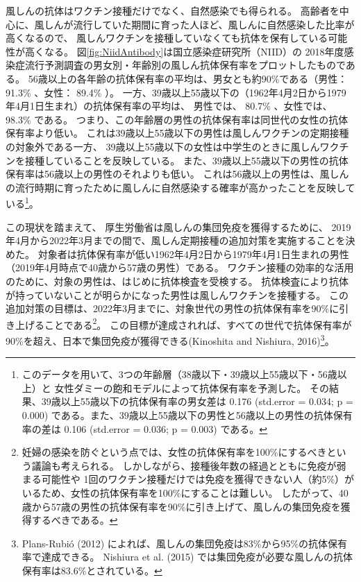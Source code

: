 \documentclass[
  11pt,
  a4paper,
]{article}
\begin{document}
風しんの抗体はワクチン接種だけでなく、自然感染でも得られる。
高齢者を中心に、風しんが流行していた期間に育った人ほど、風しんに自然感染した比率が高くなるので、
風しんワクチンを接種していなくても抗体を保有している可能性が高くなる。
図\ref{fig:NiidAntibody}は国立感染症研究所（NIID）の
2018年度感染症流行予測調査の男女別・年齢別の風しん抗体保有率をプロットしたものである。
56歳以上の各年齢の抗体保有率の平均は、男女とも約90\%である（男性：
91.3\%
、女性：
89.4\%
）。
一方、39歳以上55歳以下の（1962年4月2日から1979年4月1日生まれ）の抗体保有率の平均は、
男性では、
80.7\%
、女性では、
98.3\%
である。
つまり、この年齢層の男性の抗体保有率は同世代の女性の抗体保有率より低い。
これは39歳以上55歳以下の男性は風しんワクチンの定期接種の対象外である一方、
39歳以上55歳以下の女性は中学生のときに風しんワクチンを接種していることを反映している。
また、39歳以上55歳以下の男性の抗体保有率は56歳以上の男性のそれよりも低い。
これは56歳以上の男性は、風しんの流行時期に育ったために風しんに自然感染する確率が高かったことを反映している\footnote{このデータを用いて、3つの年齢層（38歳以下・39歳以上55歳以下・56歳以上）と
  女性ダミーの飽和モデルによって抗体保有率を予測した。
  その結果、39歳以上55歳以下の抗体保有率の男女差は
  0.176 (std.error = 0.034; p = 0.000)
  である。また、39歳以上55歳以下の男性と56歳以上の男性の抗体保有率の差は
  0.106 (std.error = 0.036; p = 0.003)
  である。}。

この現状を踏まえて、
厚生労働省は風しんの集団免疫を獲得するために、
2019年4月から2022年3月までの間で、風しん定期接種の追加対策を実施することを決めた。
対象者は抗体保有率が低い1962年4月2日から1979年4月1日生まれの男性（2019年4月時点で40歳から57歳の男性）である。
ワクチン接種の効率的な活用のために、対象の男性は、はじめに抗体検査を受検する。
抗体検査により抗体が持っていないことが明らかになった男性は風しんワクチンを接種する。
この追加対策の目標は、2022年3月までに、対象世代の男性の抗体保有率を90\%に引き上げることである\footnote{妊婦の感染を防ぐという点では、女性の抗体保有率を100\%にするべきという議論も考えられる。
  しかしながら、接種後年数の経過とともに免疫が弱まる可能性や
  1回のワクチン接種だけでは免疫を獲得できない人（約5\%）がいるため、女性の抗体保有率を100\%にすることは難しい。
  したがって、40歳から57歳の男性の抗体保有率を90\%に引き上げて、風しんの集団免疫を獲得するべきである。}。
この目標が達成されれば、すべての世代で抗体保有率が90\%を超え、日本で集団免疫が獲得できる(Kinoshita and Nishiura, 2016)\footnote{Plans-Rubió (2012) によれば、風しんの集団免疫は83\%から95\%の抗体保有率で達成できる。
  Nishiura et al. (2015) では集団免疫が必要な風しんの抗体保有率は83.6\%とされている。}。
\end{document}
